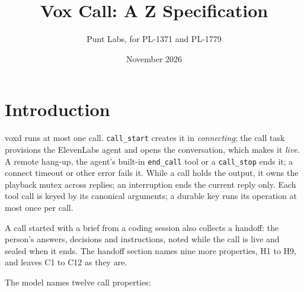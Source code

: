 \documentclass[a4paper,10pt,fleqn]{article}
\begin{document}
\title{Vox Call: A Z Specification}
\author{Punt Labs, for PL-1371 and PL-1779}
\date{November 2026}
\maketitle

\section{Introduction}

voxd runs at most one call. \texttt{call\_start} creates it in
\emph{connecting}; the call task provisions the ElevenLabs agent and opens
the conversation, which makes it \emph{live}. A remote hang-up, the agent's
built-in \texttt{end\_call} tool or a \texttt{call\_stop} ends it; a connect timeout or other error fails it.
While a call holds the output, it owns the playback mutex across replies;
an interruption ends the current reply only. Each tool call is keyed by its
canonical arguments; a durable key runs its operation at most once per call.

A call started with a brief from a coding session also collects a
handoff: the person's answers, decisions and instructions, noted while the
call is live and sealed when it ends. The handoff section names nine more
properties, H1 to H9, and leaves C1 to C12 as they are.

The model names twelve call properties:
\end{document}

